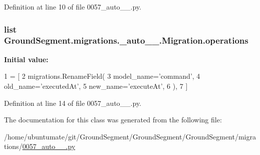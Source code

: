 Definition at line 10 of file 0057\+\_\+auto\+\_\+\_.\+py.

\hypertarget{class_ground_segment_1_1migrations_1_10057__auto__20170327__1907_1_1_migration_a6cb9f99f2667d3df18fe10d9d6fd87eb}{}
\subsubsection[{operations}]{\setlength{\rightskip}{0pt plus 5cm}list Ground\+Segment.\+migrations.\+\_\+auto\+\_\+\_.\+Migration.\+operations\hspace{0.3cm}{\ttfamily [static]}}\label{class_ground_segment_1_1migrations_1_10057__auto__20170327__1907_1_1_migration_a6cb9f99f2667d3df18fe10d9d6fd87eb}
{\bfseries Initial value\+:}
\begin{DoxyCode}
1 = [
2         migrations.RenameField(
3             model\_name=\textcolor{stringliteral}{'command'},
4             old\_name=\textcolor{stringliteral}{'executedAt'},
5             new\_name=\textcolor{stringliteral}{'executeAt'},
6         ),
7     ]
\end{DoxyCode}


Definition at line 14 of file 0057\+\_\+auto\+\_\+\_.\+py.



The documentation for this class was generated from the following file\+:\begin{DoxyCompactItemize}
\item 
/home/ubuntumate/git/\+Ground\+Segment/\+Ground\+Segment/\+Ground\+Segment/migrations/\hyperlink{0057__auto__20170327__1907_8py}{0057\+\_\+auto\+\_\+\_.\+py}\end{DoxyCompactItemize}

